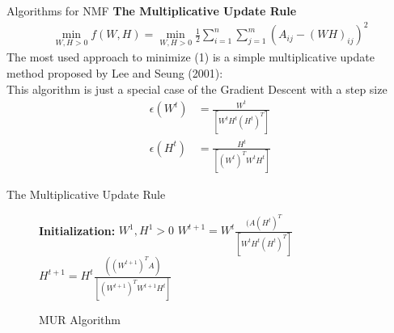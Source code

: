 \documentclass[aspectratio=169]{beamer}
\begin{document}

\begin{frame}{Algorithms for NMF}
    \textbf{The Multiplicative Update Rule}
    \begin{align}
        \min_{W,H>0}f(W,H) = \min_{W,H>0} \frac{1}{2}\sum_{i = 1}^{n}\sum_{j= 1}^{m} (A_{ij} - (WH)_{ij})^{2} \label{op}
    \end{align}
    The most used approach to minimize (1) is a simple multiplicative update method
    proposed by Lee and Seung (2001):\\
    This algorithm is just a special case of the Gradient Descent with a step size 
    \begin{align*}
        \epsilon(W^{t}) &= \frac{W^{t}}{[W^{t}H^{t}(H^{t})^{T}]}\\
        \epsilon(H^{t}) &= \frac{H^{t}}{[(W^{t})^{T}W^{t}H^{t}]}
    \end{align*}
\end{frame}
\begin{frame}{The Multiplicative Update Rule}
\begin{figure}[ht]
  \centering
  \begin{minipage}{.5\linewidth}
    \begin{algorithm}[H]
    \caption{MUR Algorithm}
     \textbf{Initialization:} $W^{1}, H^{1} > 0$\;
     {
    $W^{t+1} = W^{t}\frac{(A(H^{t})^{T}}{[W^{t}H^{t}(H^{t})^{T}]} $\;
    \vspace{0.2in}
    $H^{t+1} = H^{t}\frac{((W^{t+1})^{T}A)}{[(W^{t+1})^{T}W^{t+1}H^{t}]}$\;}
    \end{algorithm} 
    \end{minipage}
    \end{figure}
\end{frame}
\end{document}
